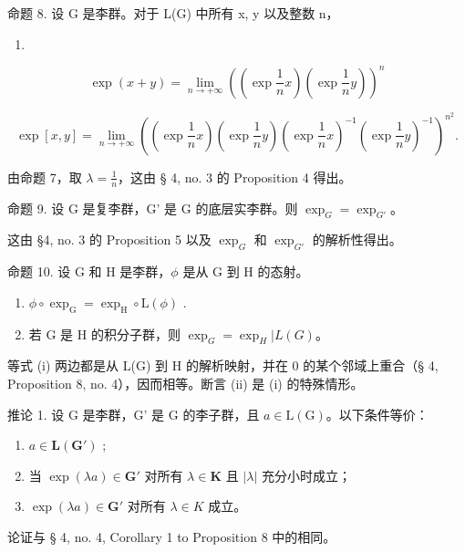 命题 8. 设 G 是李群。对于 L(G) 中所有 x, y 以及整数 n，

\begin{enumerate}
\def\labelenumi{(\arabic{enumi})}
\setcounter{enumi}{1}
\tightlist
\item
\end{enumerate}

\[
\exp (x + y) = \lim _ {n \rightarrow + \infty} \left(\left(\exp \frac {1}{n} x\right)\left(\exp \frac {1}{n} y\right)\right) ^ {n}\tag{2}
\]

\[
\exp [ x, y ] = \lim _ {n \rightarrow + \infty} \left(\left(\exp \frac {1}{n} x\right)\left(\exp \frac {1}{n} y\right)\left(\exp \frac {1}{n} x\right) ^ {- 1} \left(\exp \frac {1}{n} y\right) ^ {- 1}\right) ^ {n ^ {2}}\tag{3}.
\]

由命题 7，取 \(\lambda = \frac{1}{n}\)，这由 § 4, no. 3 的 Proposition 4 得出。

命题 9. 设 G 是复李群，G' 是 G 的底层实李群。则 \(\exp_{G} = \exp_{G'}\)。

这由 §4, no. 3 的 Proposition 5 以及 \(\exp_{G}\) 和 \(\exp_{G'}\) 的解析性得出。

命题 10. 设 G 和 H 是李群，\(\phi\) 是从 G 到 H 的态射。

\begin{enumerate}
\def\labelenumi{(\roman{enumi})}
\item
  \(\phi \circ \exp_{\mathrm{G}} = \exp_{\mathrm{H}} \circ \mathrm{L}(\phi)\) .
\item
  若 G 是 H 的积分子群，则 \(\exp_{G} = \exp_{H} | L(G)\)。
\end{enumerate}

等式 (i) 两边都是从 L(G) 到 H 的解析映射，并在 0 的某个邻域上重合（§ 4, Proposition 8, no. 4），因而相等。断言 (ii) 是 (i) 的特殊情形。

推论 1. 设 G 是李群，G' 是 G 的李子群，且 \(a \in \mathrm{L}(\mathrm{G})\)。以下条件等价：

\begin{enumerate}
\def\labelenumi{(\roman{enumi})}
\item
  \(a \in \mathbf{L}(\mathbf{G}')\) ;
\item
  当 \(\exp (\lambda a)\in \mathbf{G}'\) 对所有 \(\lambda \in \mathbf{K}\) 且 \(|\lambda |\) 充分小时成立；
\item
  \(\exp(\lambda a) \in \mathbf{G}'\) 对所有 \(\lambda \in K\) 成立。
\end{enumerate}

论证与 § 4, no. 4, Corollary 1 to Proposition 8 中的相同。

